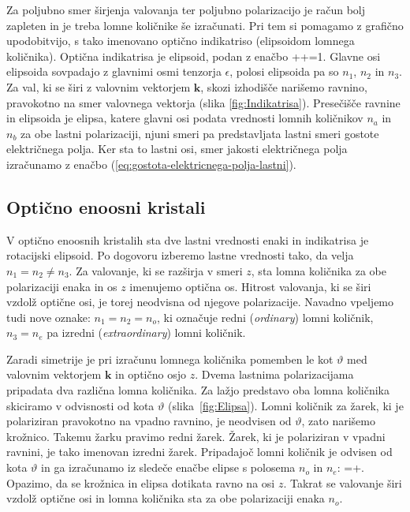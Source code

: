 Za poljubno smer širjenja valovanja ter poljubno polarizacijo je račun
bolj zapleten in je treba lomne količnike še izračunati. Pri tem si pomagamo 
z grafično upodobitvijo, s tako imenovano 
optično indikatriso (elipsoidom lomnega
količnika). Optična indikatrisa je elipsoid, podan z enačbo
\beq
{}++=1.
\eeq
Glavne osi elipsoida sovpadajo z glavnimi osmi tenzorja $\epsilon$, 
polosi elipsoida pa so $n_{1}$, $n_{2}$ in $n_{3}$. 
Za val, ki se širi z valovnim vektorjem $\mathbf{k}$, skozi izhodišče
narišemo ravnino, pravokotno na smer valovnega vektorja (slika \ref{fig:Indikatrisa}).
Presečišče ravnine in elipsoida je elipsa, katere glavni osi podata
vrednosti lomnih količnikov $n_{a}$ in $n_{b}$ za obe lastni polarizaciji,
njuni smeri pa predstavljata lastni smeri gostote električnega polja. Ker
sta to lastni osi, smer jakosti električnega polja izračunamo z
enačbo (\ref{eq:gostota-elektricnega-polja-lastni}).

\subsection*{Optično enoosni kristali}
V optično enoosnih kristalih sta dve lastni vrednosti enaki in indikatrisa je rotacijski 
elipsoid. Po dogovoru izberemo lastne vrednosti tako, da velja $n_{1}=n_{2}\neq n_{3}$. 
Za valovanje, ki se razširja v smeri $z$, sta lomna količnika za obe polarizaciji 
enaka in os $z$ imenujemo optična os. Hitrost valovanja, ki
se širi vzdolž optične osi, je torej neodvisna od njegove polarizacije.
Navadno vpeljemo tudi nove oznake: $n_{1}=n_{2}=n_{o}$, ki označuje redni (\textit{ordinary})
lomni količnik, $n_{3}=n_{e}$ pa izredni (\textit{extraordinary}) lomni količnik. 


Zaradi simetrije je pri izračunu lomnega količnika pomemben le kot 
$\vartheta$ med valovnim vektorjem $\mathbf{k}$ in optično osjo $z$. Dvema 
lastnima polarizacijama pripadata dva različna lomna količnika. 
Za lažjo predstavo oba lomna količnika skiciramo v odvisnosti
od kota $\vartheta$ (slika~\ref{fig:Elipsa}). Lomni količnik za žarek, ki
je polariziran pravokotno na vpadno ravnino, je neodvisen od $\vartheta$, zato narišemo krožnico.
Takemu žarku pravimo redni žarek. 
Žarek, ki je polariziran v vpadni ravnini, je tako imenovan izredni žarek. Pripadajoč
lomni količnik je odvisen od kota $\vartheta$ in ga izračunamo iz sledeče enačbe elipse
s polosema $n_o$ in $n_e$: 
\beq
{}=+.
\label{eq:izreden}
\eeq
Opazimo, da se krožnica in elipsa dotikata ravno na osi $z$. Takrat se 
valovanje širi vzdolž optične osi in lomna količnika sta za obe polarizaciji enaka $n_o$. 

